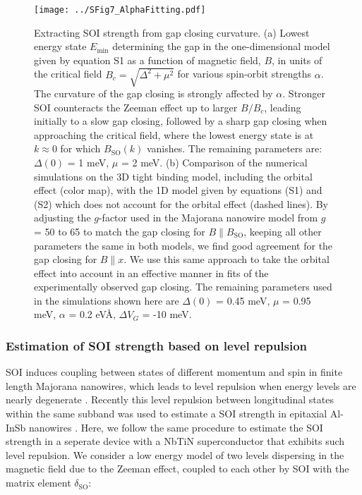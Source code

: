 \begin{figure}
\centering
\texttt{[image: ../SFig7\_AlphaFitting.pdf]}
\caption{\label{fig:SOIFit}
    Extracting SOI strength from gap closing curvature.
    (a) Lowest energy state $E_{\mathrm{min}}$ determining the gap in the one-dimensional model given by equation S1 as a function of magnetic field, $B$, in units of the critical field $B_c=\sqrt{\Delta^2+\mu^2}$ for various spin-orbit strengths $\alpha$. The curvature of the gap closing is strongly affected by $\alpha$. Stronger SOI counteracts the Zeeman effect up to larger $B/B_c$, leading initially to a slow gap closing, followed by a sharp gap closing when approaching the critical field, where the lowest energy state is at $k \approx 0$ for which $B_{\mathrm{SO}}(k)$ vanishes. The remaining parameters are: $\Delta(0)$ = 1 meV, $\mu$ = 2 meV. (b) Comparison of the numerical simulations on the 3D tight binding model, including the orbital effect (color map), with the 1D model given by equations (S1) and (S2) which does not account for the orbital effect (dashed lines). By adjusting the $g$-factor used in the Majorana nanowire model from $g$ = 50 to 65 to match the gap closing for $B \parallel B_{\mathrm{SO}}$, keeping all other parameters the same in both models, we find good agreement for the gap closing for $B \parallel x$. We use this same approach to take the orbital effect into account in an effective manner in fits of the experimentally observed gap closing. The remaining parameters used in the simulations shown here are $\Delta(0)$ = 0.45 meV, $\mu$ = 0.95 meV, $\alpha$ = 0.2 eV\AA, $\Delta V_G$ = -10 meV.
}
\end{figure}

\subsubsection{Estimation of SOI strength based on level repulsion}
SOI induces coupling between states of different momentum and spin in finite length Majorana nanowires, which leads to level repulsion when energy levels are nearly degenerate \cite{Stanescu2013}. Recently this level repulsion between longitudinal states within the same subband was used to estimate a SOI strength in epitaxial Al-InSb nanowires \cite{DeMoor2018}. Here, we follow the same procedure to estimate the SOI strength in a seperate device with a NbTiN superconductor that exhibits such level repulsion. We consider a low energy model of two levels dispersing in the magnetic field due to the Zeeman effect, coupled to each other by SOI with the matrix element $\delta_{\mathrm{SO}}$:


